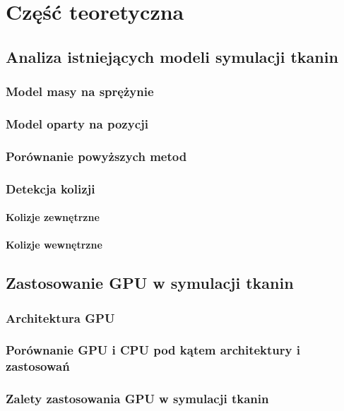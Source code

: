 \chapter{Część teoretyczna}
\label{t:teoria}


	\section{Analiza istniejących modeli symulacji tkanin}
	\label{t:teoria:analiza}
	
		\subsection{Model masy na sprężynie}
		\label{t:teoria:analiza:masa}
		
		\subsection{Model oparty na pozycji}
		\label{t:teoria:analiza:poz}
		
		\subsection{Porównanie powyższych metod}
		\label{t:teoria:analiza:porownanie}
		
		\subsection{Detekcja kolizji}
		\label{t:teoria:analiza:kolizje}
		
			\subsubsection{Kolizje zewnętrzne}
			\label{t:teoria:analiza:kolizje:zewn}
			
			\subsubsection{Kolizje wewnętrzne}
			\label{t:teoria:analiza:kolizje:wewn}
			
			
	\section{Zastosowanie GPU w symulacji tkanin}
	\label{t:teoria:gpu}
	
		\subsection{Architektura GPU}
		\label{t:teoria:gpu:architektura}
		
		\subsection{Porównanie GPU i CPU pod kątem architektury i zastosowań}
		\label{t:teoria:gpu:porownanie}
		
		\subsection{Zalety zastosowania GPU w symulacji tkanin}
		\label{t:teoria:gpu:zalety}
